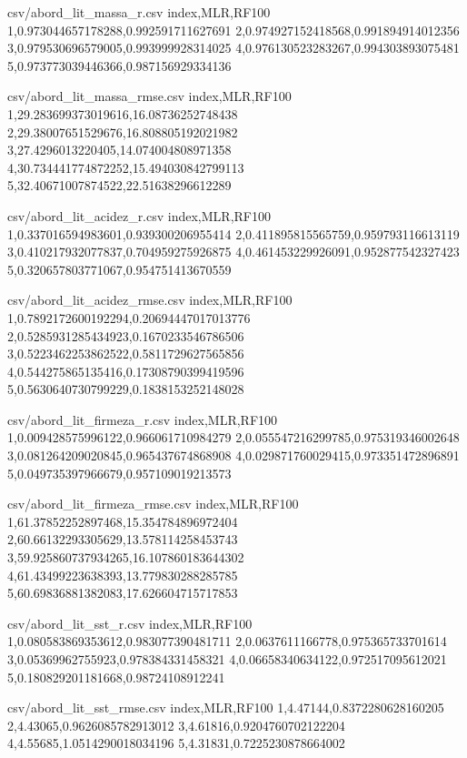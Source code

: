 \begin{filecontents*}{csv/abord_lit_massa_r.csv}
index,MLR,RF100
1,0.973044657178288,0.992591711627691
2,0.974927152418568,0.991894914012356
3,0.979530696579005,0.993999928314025
4,0.976130523283267,0.994303893075481
5,0.973773039446366,0.987156929334136
\end{filecontents*}

\begin{filecontents*}{csv/abord_lit_massa_rmse.csv}
index,MLR,RF100
1,29.283699373019616,16.08736252748438
2,29.38007651529676,16.808805192021982
3,27.4296013220405,14.074004808971358
4,30.734441774872252,15.494030842799113
5,32.40671007874522,22.51638296612289
\end{filecontents*}

\begin{filecontents*}{csv/abord_lit_acidez_r.csv}
index,MLR,RF100
1,0.337016594983601,0.939300206955414
2,0.411895815565759,0.959793116613119
3,0.410217932077837,0.704959275926875
4,0.461453229926091,0.952877542327423
5,0.320657803771067,0.954751413670559
\end{filecontents*}

\begin{filecontents*}{csv/abord_lit_acidez_rmse.csv}
index,MLR,RF100
1,0.7892172600192294,0.20694447017013776
2,0.5285931285434923,0.1670233546786506
3,0.5223462253862522,0.5811729627565856
4,0.544275865135416,0.17308790399419596
5,0.5630640730799229,0.1838153252148028
\end{filecontents*}

\begin{filecontents*}{csv/abord_lit_firmeza_r.csv}
index,MLR,RF100
1,0.009428575996122,0.966061710984279
2,0.055547216299785,0.975319346002648
3,0.081264209020845,0.965437674868908
4,0.029871760029415,0.973351472896891
5,0.049735397966679,0.957109019213573
\end{filecontents*}

\begin{filecontents*}{csv/abord_lit_firmeza_rmse.csv}
index,MLR,RF100
1,61.37852252897468,15.354784896972404
2,60.66132293305629,13.578114258453743
3,59.925860737934265,16.107860183644302
4,61.43499223638393,13.779830288285785
5,60.69836881382083,17.626604715717853
\end{filecontents*}

\begin{filecontents*}{csv/abord_lit_sst_r.csv}
index,MLR,RF100
1,0.080583869353612,0.983077390481711
2,0.0637611166778,0.975365733701614
3,0.05369962755923,0.978384331458321
4,0.06658340634122,0.972517095612021
5,0.180829201181668,0.98724108912241
\end{filecontents*}

\begin{filecontents*}{csv/abord_lit_sst_rmse.csv}
index,MLR,RF100
1,4.47144,0.8372280628160205
2,4.43065,0.9626085782913012
3,4.61816,0.9204760702122204
4,4.55685,1.0514290018034196
5,4.31831,0.7225230878664002
\end{filecontents*}